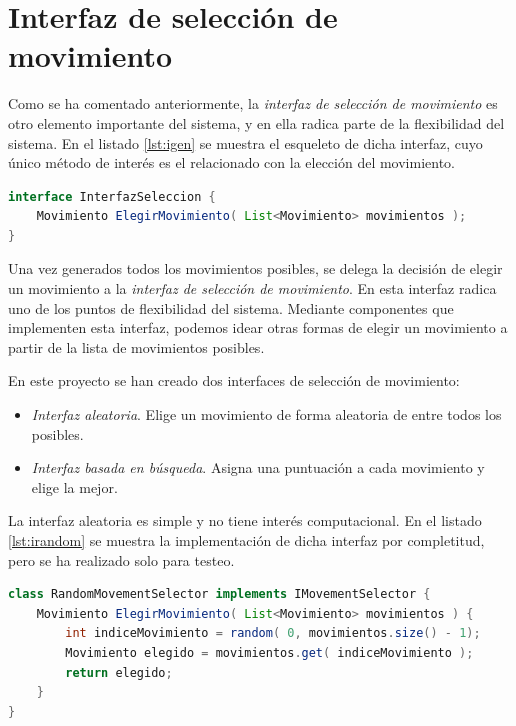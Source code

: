 \section{Interfaz de selección de movimiento}

Como se ha comentado anteriormente, la \emph{interfaz de selección de movimiento} es otro elemento importante del sistema, y en ella radica parte de la flexibilidad del sistema. En el listado \ref{lst:igen} se muestra el esqueleto de dicha interfaz, cuyo único método de interés es el relacionado con la elección del movimiento.

\begin{lstlisting}[caption={Interfaz de selección de movimiento},label={lst:igen},language=Java,escapechar=|]
interface InterfazSeleccion {
	Movimiento ElegirMovimiento( List<Movimiento> movimientos );
}
\end{lstlisting}

Una vez generados todos los movimientos posibles, se delega la decisión de elegir un movimiento a la \emph{interfaz de selección de movimiento}. En esta interfaz radica uno de los puntos de flexibilidad del sistema. Mediante componentes que implementen esta interfaz, podemos idear otras formas de elegir un movimiento a partir de la lista de movimientos posibles.

En este proyecto se han creado dos interfaces de selección de movimiento:

\begin{itemize}
	\item \emph{Interfaz aleatoria}. Elige un movimiento de forma aleatoria de entre todos los posibles.
	\item \emph{Interfaz basada en búsqueda}. Asigna una puntuación a cada movimiento y elige la mejor.
\end{itemize}

La interfaz aleatoria es simple y no tiene interés computacional. En el listado \ref{lst:irandom} se muestra la implementación de dicha interfaz por completitud, pero se ha realizado solo para testeo.

\begin{lstlisting}[caption={Implementación aleatoria de la interfaz de selección de movimiento},label={lst:irandom},language=Java,escapechar=|]
class RandomMovementSelector implements IMovementSelector {
	Movimiento ElegirMovimiento( List<Movimiento> movimientos ) {
		int indiceMovimiento = random( 0, movimientos.size() - 1);
		Movimiento elegido = movimientos.get( indiceMovimiento );
		return elegido;
	}
}
\end{lstlisting}

